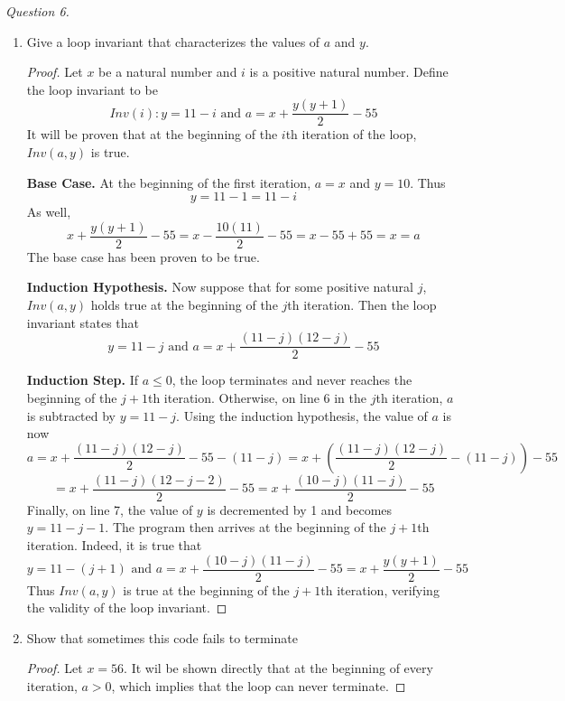 \documentclass[11pt]{article}
\begin{document}
    \textit{Question 6.}\begin{enumerate}
        \item Give a loop invariant that characterizes the values of \(a\) and \(y\).
        \begin{proof}
            Let \(x\) be a natural number and \(i\) is a positive natural number. Define the loop invariant to be
            \[
                Inv(i) : y = 11 - i \text{ and } a = x + \frac{y(y+1)}{2} - 55
            \]
            It will be proven that at the beginning of the \(i\)th iteration of the loop, \(Inv(a,y)\) is true.

            \textbf{Base Case.} At the beginning of the first iteration, \(a=x\) and \(y=10\). Thus
            \[
                y = 11 - 1 = 11 - i
            \]
            As well,
            \[
                x + \frac{y(y+1)}{2} - 55 = x - \frac{10(11)}{2} - 55 = x - 55 + 55 = x = a
            \]
            The base case has been proven to be true.

            \textbf{Induction Hypothesis.} Now suppose that for some positive natural \(j\), \(Inv(a,y)\) holds true at the beginning of the \(j\)th iteration. Then the loop invariant states that 
            \[
                y = 11 - j \text{ and } a = x +\frac{(11-j)(12-j)}{2}-55
            \]

            \textbf{Induction Step.} If \(a \leq 0\), the loop terminates and never reaches the beginning of the \(j+1\)th iteration. Otherwise, on line 6 in the \(j\)th iteration, \(a\) is subtracted by \(y=11-j\). Using the induction hypothesis, the value of \(a\) is now
            \[
                a = x + \frac{(11-j)(12-j)}{2} - 55 - (11-j) = x + \left(\frac{(11-j)(12-j)}{2} - (11 - j)\right) - 55
            \]
            \[
                = x+\frac{(11-j)(12-j-2)}{2}-55 = x+\frac{(10-j)(11-j)}{2}-55
            \]
            Finally, on line 7, the value of \(y\) is decremented by 1 and becomes \(y = 11-j-1\). The program then arrives at the beginning of the \(j+1\)th iteration. Indeed, it is true that
            \[
                y = 11 - (j+1) \text{ and } a = x+\frac{(10-j)(11-j)}{2}-55 = x+\frac{y(y+1)}{2}-55
            \]
            Thus \(Inv(a,y)\) is true at the beginning of the \(j+1\)th iteration, verifying the validity of the loop invariant.

        \end{proof}
        
        \item Show that sometimes this code fails to terminate
        \begin{proof}
            Let \(x=56\). It wil be shown directly that at the beginning of every iteration, \(a > 0\), which implies that the loop can never terminate.


\end{proof}
\end{enumerate}
\end{document}
